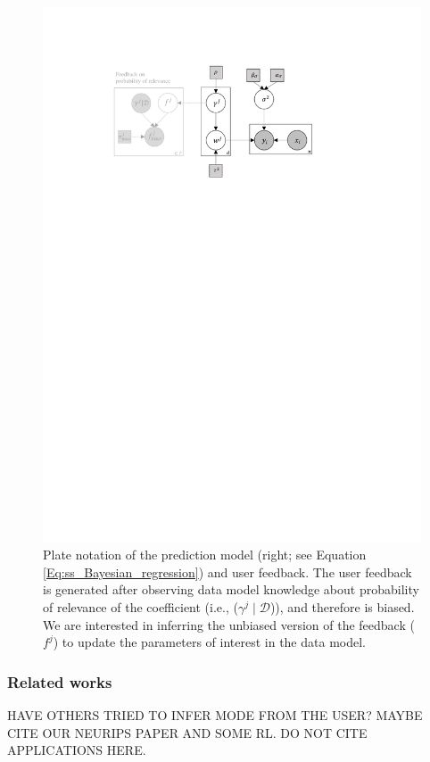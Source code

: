 \documentclass[dissertation,math,vertlayout,pdfa,colorlinks]{aaltoseries}
\newcommand{\bD}{\mathcal{D}}
\begin{document}
\begin{figure}
	\centering
	\includegraphics[width=0.90\linewidth]{Figures/Plate_diagram_OF.pdf}
	\caption{Plate notation of the prediction model (right; see Equation \ref{Eq:ss_Bayesian_regression}) and user  feedback. The user feedback is generated after observing data model knowledge about probability of relevance of the coefficient (i.e., ($\gamma^j\mid \bD$)), and therefore is biased. We are interested in inferring the unbiased version of the feedback ($f^j$) to update the parameters of interest in the data model.}
	\label{fig:Plate_OF}
\end{figure}

\subsubsection{Related works}
HAVE OTHERS TRIED TO INFER MODE FROM THE USER? MAYBE CITE OUR NEURIPS PAPER AND SOME RL. DO NOT CITE APPLICATIONS HERE.
\end{document}

